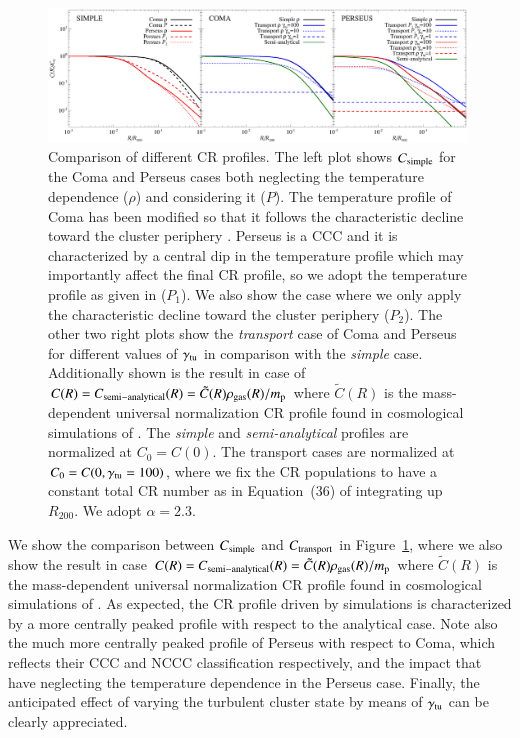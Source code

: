 \documentclass[traditabstract]{aa}
\begin{document}
\begin{appendix}
\begin{figure}[hbt!]
\centering
\includegraphics[width=0.99\textwidth]{figures/CR_profiles_simple_comparison.eps}
\caption{Comparison of different CR profiles. The left plot shows $C_{\rm{simple}}$ for the Coma and Perseus cases both neglecting the temperature dependence ($\rho$) and considering it ($P$). The temperature profile of Coma has been modified so that it follows the characteristic decline toward the cluster periphery \citep{2007MNRAS.378..385P,2010MNRAS.409..449P}. Perseus is a CCC and it is characterized by a central dip in the temperature profile which may importantly affect the final CR profile, so we adopt the temperature profile as given in \citep{2004A&A...413...17P} ($P_{1}$). We also show the case where we only apply the characteristic decline toward the cluster periphery ($P_{2}$). The other two right plots show the \emph{transport} case of Coma and Perseus for different values of $\gamma_{\rm{tu}}$ in comparison with the \emph{simple} case. Additionally shown is the result in case of $C(R)=C_{\rm{semi-analytical}}(R)=\tilde{C}(R)\rho_{\rm{gas}}(R)/m_{\rm{p}}$ where $\tilde{C}(R)$ is the mass-dependent universal normalization CR profile found in cosmological simulations of \cite{2010MNRAS.409..449P}. The \emph{simple} and \emph{semi-analytical} profiles are normalized at $C_{0}=C(0)$. The transport cases are normalized at $C_{0}=C(0,\gamma_{\rm{tu}}=100)$, where we fix the CR populations to have a constant total CR number as in Equation~(36) of \cite{2011A&A...527A..99E} integrating up $R_{200}$. We adopt $\alpha=2.3$.}
\label{fig:simpleVStransport}
\end{figure}

We show the comparison between $C_{\rm{simple}}$ and $C_{\rm{transport}}$ in Figure~\ref{fig:simpleVStransport}, where we also show the result in case $C(R)=C_{\rm{semi-analytical}}(R)=\tilde{C}(R)\rho_{\rm{\rm{gas}}}(R)/m_{\rm{p}}$ where $\tilde{C}(R)$ is the mass-dependent universal normalization CR profile found in cosmological simulations of \cite{2010MNRAS.409..449P}. As expected, the CR profile driven by simulations is characterized by a more centrally peaked profile with respect to the analytical case. Note also the much more centrally peaked profile of Perseus with respect to Coma, which reflects their CCC and NCCC classification respectively, and the impact that have neglecting the temperature dependence in the Perseus case. Finally, the anticipated effect of varying the turbulent cluster state by means of $\gamma_{\rm{tu}}$ can be clearly appreciated.


\end{appendix}
\end{document}
